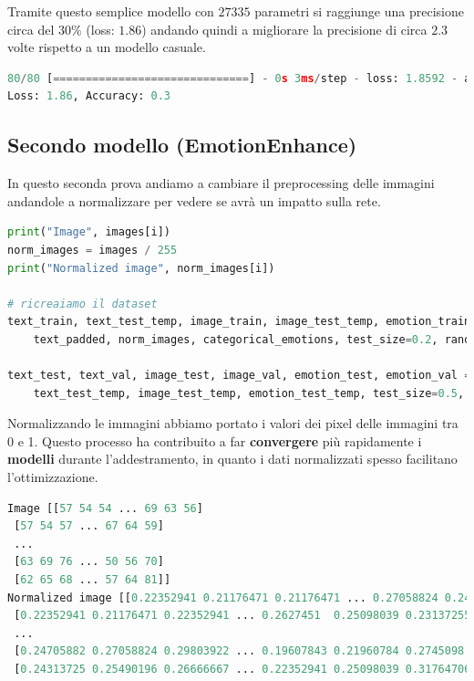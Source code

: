 \documentclass{article}
\begin{document}
Tramite questo semplice modello con $27335$ parametri si raggiunge una precisione circa del $30\%$ (loss: $1.86$) andando quindi a migliorare la precisione di circa $2.3$ volte rispetto a un modello casuale.

\bigskip

\begin{lstlisting}[language=Python, caption=Risultati ottenuti modello lineare]
80/80 [==============================] - 0s 3ms/step - loss: 1.8592 - accuracy: 0.2965
Loss: 1.86, Accuracy: 0.3
\end{lstlisting}

\subsection{Secondo modello (EmotionEnhance)}
In questo seconda prova andiamo a cambiare il preprocessing delle immagini andandole a normalizzare per vedere se avrà un impatto sulla rete.
\begin{lstlisting}[language=Python, caption=Normalizzazione delle immagini]
print("Image", images[i])
norm_images = images / 255
print("Normalized image", norm_images[i])

# ricreaiamo il dataset
text_train, text_test_temp, image_train, image_test_temp, emotion_train, emotion_test_temp = train_test_split(
    text_padded, norm_images, categorical_emotions, test_size=0.2, random_state=42)

text_test, text_val, image_test, image_val, emotion_test, emotion_val = train_test_split(
    text_test_temp, image_test_temp, emotion_test_temp, test_size=0.5, random_state=42)
\end{lstlisting}

Normalizzando le immagini abbiamo portato i valori dei pixel delle immagini tra 0 e 1. Questo processo ha contribuito a far \textbf{convergere} più rapidamente i \textbf{modelli} durante l'addestramento, in quanto i dati normalizzati spesso facilitano l'ottimizzazione. 

\begin{lstlisting}[language=Python, caption=differenza immagine normalizzata]
Image [[57 54 54 ... 69 63 56]
 [57 54 57 ... 67 64 59]
 ...
 [63 69 76 ... 50 56 70]
 [62 65 68 ... 57 64 81]]
Normalized image [[0.22352941 0.21176471 0.21176471 ... 0.27058824 0.24705882 0.21960784]
 [0.22352941 0.21176471 0.22352941 ... 0.2627451  0.25098039 0.23137255]
 ...
 [0.24705882 0.27058824 0.29803922 ... 0.19607843 0.21960784 0.2745098 ]
 [0.24313725 0.25490196 0.26666667 ... 0.22352941 0.25098039 0.31764706]]
\end{lstlisting}
\end{document}
